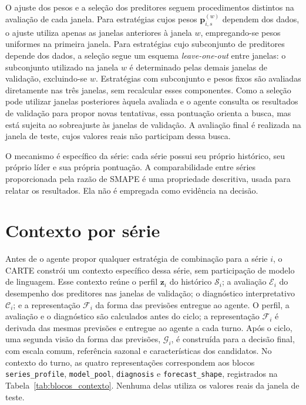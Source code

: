 O ajuste dos pesos e a seleção dos preditores seguem procedimentos distintos na avaliação de cada janela. Para estratégias cujos pesos $\mathbf{p}_{i,s}^{(w)}$ dependem dos dados, o ajuste utiliza apenas as janelas anteriores à janela $w$, empregando-se pesos uniformes na primeira janela. Para estratégias cujo subconjunto de preditores depende dos dados, a seleção segue um esquema \textit{leave-one-out} entre janelas: o subconjunto utilizado na janela $w$ é determinado pelas demais janelas de validação, excluindo-se $w$. Estratégias com subconjunto e pesos fixos são avaliadas diretamente nas três janelas, sem recalcular esses componentes. Como a seleção pode utilizar janelas posteriores àquela avaliada e o agente consulta os resultados de validação para propor novas tentativas, essa pontuação orienta a busca, mas está sujeita ao sobreajuste às janelas de validação. A avaliação final é realizada na janela de teste, cujos valores reais não participam dessa busca.

O mecanismo é específico da série: cada série possui seu próprio histórico, seu próprio líder e sua própria pontuação. A comparabilidade entre séries proporcionada pela razão de SMAPE é uma propriedade descritiva, usada para relatar os resultados. Ela não é empregada como evidência na decisão.




\section{Contexto por série} \label{sec:diagnostico}

Antes de o agente propor qualquer estratégia de combinação para a série $i$, o CARTE constrói um contexto específico dessa série, sem participação de modelo de linguagem. Esse contexto reúne o perfil $\mathbf{z}_i$ do histórico $\mathcal{S}_i$; a avaliação $\mathcal{E}_i$ do desempenho dos preditores nas janelas de validação; o diagnóstico interpretativo $\mathcal{C}_i$; e a representação $\mathcal{F}_i$ da forma das previsões entregue ao agente. O perfil, a avaliação e o diagnóstico são calculados antes do ciclo; a representação $\mathcal{F}_i$ é derivada das mesmas previsões e entregue ao agente a cada turno. Após o ciclo, uma segunda visão da forma das previsões, $\mathcal{G}_i$, é construída para a decisão final, com escala comum, referência sazonal e características dos candidatos. No contexto do turno, as quatro representações correspondem aos blocos \texttt{series\_profile}, \texttt{model\_pool}, \texttt{diagnosis} e \texttt{forecast\_shape}, registrados na Tabela~\ref{tab:blocos_contexto}. Nenhuma delas utiliza os valores reais da janela de teste.

